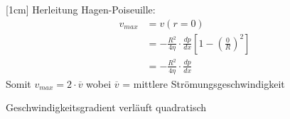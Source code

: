 \documentclass[a4paper,10pt]{article}
\begin{document}
\pagebreak
\reversemarginpar
\marginnote[$v_{max}$ ist am größten, wenn $r = 0$]{}[1cm]
Herleitung Hagen-Poiseuille:
\begin{align*}
v_{max} &= v (r = 0) \\
		&= -\frac{R^2}{4 \eta} \cdot \frac{dp}{dx} \left[1- (\frac{0}{R})^2 \right]  \\
		&= -\frac{R^2}{4 \eta} \cdot \frac{dp}{dx}
\end{align*}
Somit $v_{max} = 2 \cdot \overline{v}$ wobei $\overline{v}$ = mittlere Strömungsgeschwindigkeit \par \hfill \RA Geschwindigkeitsgradient verläuft quadratisch







%
%
%
%
%


	
\end{document}
